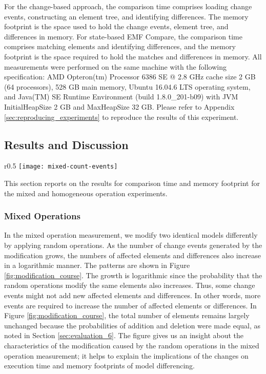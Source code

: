 For the change-based approach, the comparison time comprises loading change events, constructing an element tree, and identifying differences. The memory footprint is the space used to hold the change events, element tree, and differences in memory. For state-based EMF Compare, the comparison time comprises matching elements and identifying differences, and the memory footprint is the space required to hold the matches and differences in memory. All measurements were performed on the same machine with the following specification: AMD Opteron(tm) Processor 6386 SE @ 2.8 GHz cache size 2 GB (64 processors), 528 GB main memory, Ubuntu 16.04.6 LTS operating system, and Java(TM) SE Runtime Environment (build 1.8.0\_201-b09) with JVM \textsf{InitialHeapSize} 2 GB and \textsf{MaxHeapSize} 32 GB. Please refer to Appendix \ref{sec:reproducing_experiments} to reproduce the results of this experiment.

\subsection{Results and Discussion}
\label{sec:results_and_discussion}

\begin{wrapfigure}[9]{r}{0.5\textwidth}
  \vspace{-20pt}
  \texttt{[image: mixed-count-events]}
  \caption{total elements, affected elements, and diffs}
  \label{fig:modification_course}
\end{wrapfigure}

This section reports on the results for comparison time and memory footprint for the mixed and homogeneous operation experiments.

\vspace{-5pt}
\subsubsection{Mixed Operations}
\label{sec:mixed-operation}
In the mixed operation measurement, we modify two identical models differently by applying random operations. As the number of change events generated by the modification grows, the numbers of affected elements and differences also increase in a logarithmic manner. The patterns are shown in Figure \ref{fig:modification_course}. The growth is logarithmic since the probability that the random operations modify the same elements also increases. Thus, some change events might not add new affected elements and differences. In other words, more events are required to increase the number of affected elements or differences. In Figure \ref{fig:modification_course}, the total number of elements remains largely unchanged because the probabilities of addition and deletion were made equal, as noted in Section \ref{sec:evaluation_6}. The figure gives us an insight about the characteristics of the modification caused by the random operations in the mixed operation measurement; it helps to explain the implications of the changes on execution time and memory footprints of model differencing.

